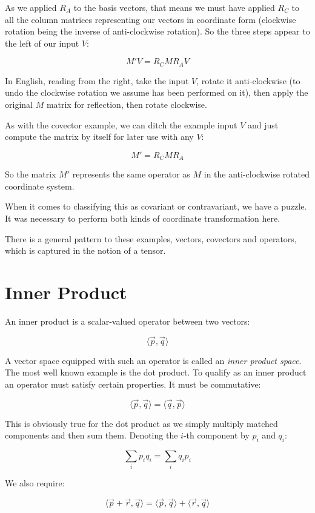 As we applied $R_A$ to the basis vectors, that means we must have applied $R_C$ to all the column matrices representing our vectors in coordinate form (clockwise rotation being the inverse of anti-clockwise rotation). So the three steps appear to the left of our input $V$:

$$M'V = R_CMR_AV$$

In English, reading from the right, take the input $V$, rotate it anti-clockwise (to undo the clockwise rotation we assume has been performed on it), then apply the original $M$ matrix for reflection, then rotate clockwise.

As with the covector example, we can ditch the example input $V$ and just compute the matrix by itself for later use with any $V$:

$$M' = R_CMR_A$$

So the matrix $M'$ represents the same operator as $M$ in the anti-clockwise rotated coordinate system.

When it comes to classifying this as covariant or contravariant, we have a puzzle. It was necessary to perform both kinds of coordinate transformation here.

There is a general pattern to these examples, vectors, covectors and operators, which is captured in the notion of a tensor.

\section{Inner Product}

An inner product is a scalar-valued operator between two vectors:

$$\langle \vec{p},\vec{q}\rangle$$

A vector space equipped with such an operator is called an \textit{inner product space}. The most well known example is the dot product. To qualify as an inner product an operator must satisfy certain properties. It must be commutative:

$$\langle \vec{p},\vec{q}\rangle = \langle \vec{q},\vec{p}\rangle$$

This is obviously true for the dot product as we simply multiply matched components and then sum them. Denoting the $i$-th component by $p_i$ and $q_i$:

$$\sum_i p_i q_i = \sum_i q_i p_i$$

We also require:

$$\langle \vec{p}+\vec{r},\vec{q}\rangle = \langle \vec{p},\vec{q}\rangle + \langle \vec{r},\vec{q}\rangle$$

